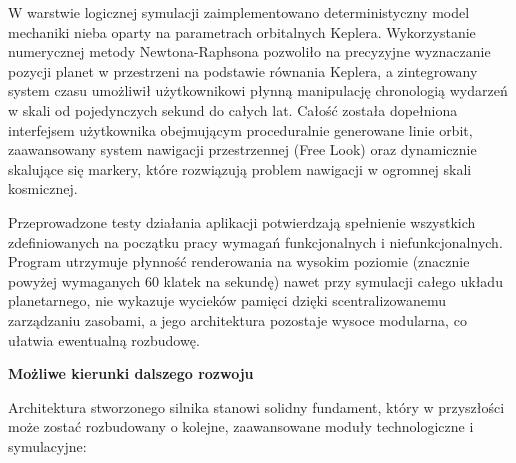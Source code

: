 \documentclass[xodstep]{wnspt}
\begin{document}
W warstwie logicznej symulacji zaimplementowano deterministyczny model mechaniki nieba oparty na parametrach orbitalnych Keplera. Wykorzystanie numerycznej metody Newtona-Raphsona pozwoliło na precyzyjne wyznaczanie pozycji planet w przestrzeni na podstawie równania Keplera, a zintegrowany system czasu umożliwił użytkownikowi płynną manipulację chronologią wydarzeń w skali od pojedynczych sekund do całych lat. Całość została dopełniona interfejsem użytkownika obejmującym proceduralnie generowane linie orbit, zaawansowany system nawigacji przestrzennej (Free Look) oraz dynamicznie skalujące się markery, które rozwiązują problem nawigacji w ogromnej skali kosmicznej.

Przeprowadzone testy działania aplikacji potwierdzają spełnienie wszystkich zdefiniowanych na początku pracy wymagań funkcjonalnych i niefunkcjonalnych. Program utrzymuje płynność renderowania na wysokim poziomie (znacznie powyżej wymaganych 60 klatek na sekundę) nawet przy symulacji całego układu planetarnego, nie wykazuje wycieków pamięci dzięki scentralizowanemu zarządzaniu zasobami, a jego architektura pozostaje wysoce modularna, co ułatwia ewentualną rozbudowę.

\newpage

\vspace{1em}
\noindent \textbf{\Large Możliwe kierunki dalszego rozwoju}
\vspace{0.5em}

Architektura stworzonego silnika stanowi solidny fundament, który w przyszłości może zostać rozbudowany o kolejne, zaawansowane moduły technologiczne i symulacyjne:
\end{document}
